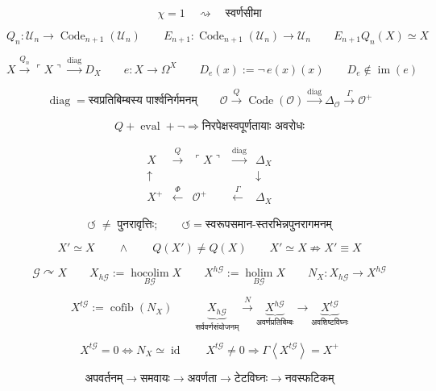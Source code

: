 \documentclass{article}
\begin{document}
\[
\boxed{
\chi=1
\quad\rightsquigarrow\quad
\text{स्वर्णसीमा}
}
\]

\[
Q_n:
\mathcal U_n
\longrightarrow
\operatorname{Code}_{n+1}(\mathcal U_n)
\qquad
E_{n+1}:
\operatorname{Code}_{n+1}(\mathcal U_n)
\longrightarrow
\mathcal U_n
\qquad
E_{n+1}Q_n(X)
\simeq
X
\]

\[
\boxed{
X
\xrightarrow{Q_n}
\ulcorner X\urcorner
\xrightarrow{\operatorname{diag}}
D_X
}
\qquad
e:X\longrightarrow\Omega^X
\qquad
D_e(x)
:=
\neg\,e(x)(x)
\qquad
D_e\notin\operatorname{im}(e)
\]

\[
\boxed{
\operatorname{diag}
=
\text{स्वप्रतिबिम्बस्य पार्श्वनिर्गमनम्}
}
\qquad
\mathcal O
\xrightarrow{Q}
\operatorname{Code}(\mathcal O)
\xrightarrow{\operatorname{diag}}
\Delta_{\mathcal O}
\xrightarrow{\Gamma}
\mathcal O^{+}
\]

\[
\boxed{
Q
+
\operatorname{eval}
+
\neg
\Longrightarrow
\text{निरपेक्षस्वपूर्णतायाः अवरोधः}
}
\]

\[
\begin{array}{ccccc}
X
&\xrightarrow{Q}&
\ulcorner X\urcorner
&\xrightarrow{\operatorname{diag}}&
\Delta_X
\\
\uparrow&&&&\downarrow
\\
X^{+}
&\xleftarrow{\Phi}&
\mathcal O^{+}
&\xleftarrow{\Gamma}&
\Delta_X
\end{array}
\]

\[
\boxed{
\circlearrowleft
\;\neq\;
\text{पुनरावृत्तिः};
\qquad
\circlearrowleft
=
\text{स्वरूपसमान-स्तरभिन्नपुनरागमनम्}
}
\]

\[
X'
\simeq X
\qquad\wedge\qquad
Q(X')\neq Q(X)
\qquad
\boxed{
X'
\simeq X
\not\Rightarrow
X'\equiv X
}
\]

\[
\mathcal G\curvearrowright X
\qquad
X_{h\mathcal G}
:=
\operatorname*{hocolim}_{B\mathcal G}X
\qquad
X^{h\mathcal G}
:=
\operatorname*{holim}_{B\mathcal G}X
\qquad
N_X:
X_{h\mathcal G}
\longrightarrow
X^{h\mathcal G}
\]

\[
\boxed{
X^{t\mathcal G}
:=
\operatorname{cofib}(N_X)
}
\qquad
\boxed{
\underbrace{X_{h\mathcal G}}_{\text{सर्ववर्णसंयोजनम्}}
\xrightarrow{\;N\;}
\underbrace{X^{h\mathcal G}}_{\text{अवर्णप्रतिबिम्बः}}
\longrightarrow
\underbrace{X^{t\mathcal G}}_{\text{अवशिष्टविघ्नः}}
}
\]

\[
X^{t\mathcal G}=0
\iff
N_X\simeq\operatorname{id}
\qquad
X^{t\mathcal G}\neq0
\Longrightarrow
\Gamma
\left\langle
X^{t\mathcal G}
\right\rangle
=
X^{+}
\]

\[
\boxed{
\text{अपवर्तनम्}
\longrightarrow
\text{समवायः}
\longrightarrow
\text{अवर्णता}
\longrightarrow
\text{टेटविघ्नः}
\longrightarrow
\text{नवस्फटिकम्}
}
\]
\end{document}
